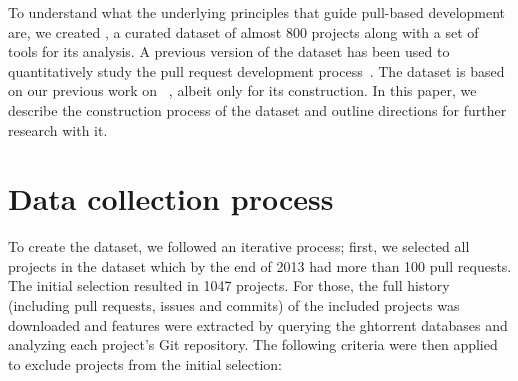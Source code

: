 \documentclass{sig-alternate}
\begin{document}
To understand what the underlying principles that guide pull-based development
are, we created \pullreqs, a curated dataset of almost 800 projects along with a
set of tools for its analysis. A previous version of the dataset has been used
to quantitatively study the pull request development process~\cite{GPD14}. The
\pullreqs dataset is based on our previous work on \ghtorrent~\cite{Gousi13}, albeit only for
its construction. In this paper, we describe the construction process of the
dataset and outline directions for further research with it.

\section{Data collection process}
\label{sec:expdata}

To create the dataset, we followed an iterative process; first, we selected all
projects in the \ghtorrent dataset which by the end of 2013 had more than 100
pull requests. The initial selection resulted in 1047 projects. For those, the
full history (including pull requests, issues and commits) of the included
projects was downloaded and features were extracted by querying the {\sc
ght}orrent databases and analyzing each project's Git repository. The following
criteria were then applied to exclude projects from the initial selection:
\end{document}
